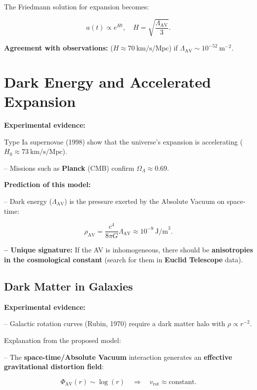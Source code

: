 \documentclass[a4paper]{article}
\theoremstyle{definition}
\theoremstyle{remark}
\numberwithin{equation}{section}
\begin{document}
The Friedmann solution for expansion becomes:

\begin{equation}
	a(t) \propto e^{Ht}, \quad H = \sqrt{\frac{\Lambda_{\text{AV}}}{3}}.
\end{equation}

\textbf{Agreement with observations:} (\( H \approx 70 \ \text{km/s/Mpc} \)) if \( \Lambda_{\text{AV}} \sim 10^{-52} \ \text{m}^{-2} \).

\section{Dark Energy and Accelerated Expansion}

\textbf{Experimental evidence:}

Type Ia supernovae (1998) show that the universe’s expansion is accelerating (\( H_0 \approx 73 \ \text{km/s/Mpc} \)).

– Missions such as \textbf{Planck} (CMB) confirm \( \Omega_\Lambda \approx 0.69 \).

\textbf{Prediction of this model:}

– Dark energy (\( \Lambda_{\text{AV}} \)) is the pressure exerted by the Absolute Vacuum on space-time:

\begin{equation}
	\rho_{\text{AV}} = \frac{c^4}{8\pi G} \Lambda_{\text{AV}} \approx 10^{-9} \ \text{J/m}^3.
\end{equation}

\textbf{– Unique signature:} If the AV is inhomogeneous, there should be \textbf{anisotropies in the cosmological constant} (search for them in \textbf{Euclid Telescope} data).

	
	
\subsection{Dark Matter in Galaxies}

\textbf{Experimental evidence:}

– Galactic rotation curves (Rubin, 1970) require a dark matter halo with \( \rho \propto r^{-2} \).

Explanation from the proposed model:

– The \textbf{space-time/Absolute Vacuum} interaction generates an \textbf{effective gravitational distortion field}:

\begin{equation}
	\Phi_{\text{AV}}(r) \sim \log(r) \quad \Rightarrow \quad v_{\text{rot}} \approx \text{constant}.
\end{equation}
\end{document}
